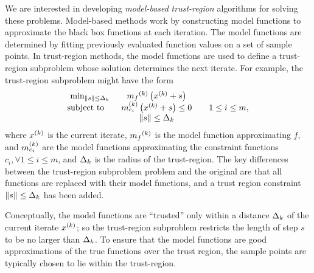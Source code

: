 We are interested in developing {\em model-based} {\em trust-region} algorithms for solving these problems.
Model-based methods work by constructing model functions to approximate the black box functions at each iteration.
The model functions are determined by fitting previously evaluated function values on a set of sample points.
In trust-region methods, the model functions are used to define a trust-region subproblem whose solution determines the next iterate.
For example, the trust-region subproblem might have the form
\begin{align*}
\begin{array}{ccl} \min_{\|s\| \le \Delta_k}
 & {{m}_f}^{(k)} \left(x^{(k)}+s\right) \\
\mbox{subject to} \quad & {{m}^{(k)}_{c_i}}\left(x^{(k)} + s\right) \le 0 & \quad 1 \le i \le m, \\
& \|s\| \le \Delta_k \\
\end{array}
\end{align*}
where $x^{(k)}$ is the current iterate, ${{m}_f}^{(k)}$ is the model function approximating $f$, 
and ${{m}^{(k)}_{c_i}}$ are the model functions approximating the constraint functions $c_i, \forall 1 \le i \le m$, and $\Delta_k$ is the radius of the trust-region.
The key differences between the trust-region subproblem problem and the original are that all functions are replaced with their model functions, 
and a trust region constraint $\|s\| \le \Delta_k$ has been added.




Conceptually, the model functions are ``trusted'' only within a distance $ \Delta_k $ of the current iterate $x^{(k)}$; 
so the trust-region subproblem restricts the length of step $s$ to be no larger than $\Delta_k$.
To ensure that the model functions are good approximations of the true functions over the trust region, 
the sample points are typically chosen to lie within the trust-region.

